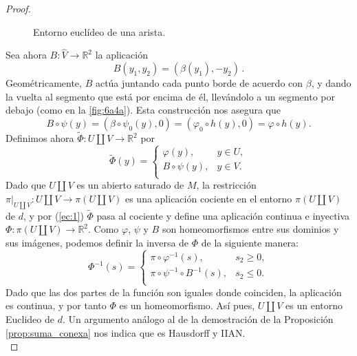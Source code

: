 \documentclass[10pt]{report}
\newcommand{\R}{\mathbb{R}}
\theoremstyle{definition}
\begin{document}
\begin{proof}
\begin{figure}
\caption{Entorno euclídeo de una arista. \label{fig:6a4a}}
\end{figure}

Sea ahora $B:\widehat{V}\to \R^2$ la aplicación $$B(y_1,y_2)=\left(\beta (y_1), -y_2\right)\, .$$
Geométricamente, $B$ actúa juntando cada punto borde de acuerdo con $\beta$, y dando la vuelta al segmento que está por encima de él, llevándolo a un segmento por debajo (como en la \autoref{fig:6a4a}). Esta construcción nos asegura que 
\begin{equation}\label{ec:1}
B\circ \psi(y)=\left(\beta \circ \psi_0(y),0\right)=\left(\varphi_0 \circ h(y),0\right)=\varphi \circ h(y).
\end{equation}
Definimos ahora $\tilde{\Phi}:U\amalg V\to \R^2$ por $$\tilde{\Phi}(y)=\begin{cases}
\varphi(y), & y\in U,\\
B\circ \psi (y), & y\in V.\\
\end{cases}$$
Dado que $U\amalg V$ es un abierto saturado de $M$, la restricción $\pi|_{U\amalg V}:U\amalg V\to \pi (U\amalg V)$ es una aplicación cociente en el entorno $\pi (U\amalg V)$ de $d$, y por (\ref{ec:1}) $\tilde{\Phi}$ pasa al cociente y define una aplicación continua e inyectiva $\Phi :\pi (U\amalg V)\to \R^2$. Como $\varphi$, $\psi$ y $B$ son homeomorfismos entre sus dominios y sus imágenes, podemos definir la inversa de $\Phi$ de la siguiente manera:
$$\Phi ^{-1}(s)= \begin{cases} 
\pi \circ \varphi ^{-1}(s), & s_2\geq 0, \\
\pi \circ \psi ^{-1} \circ B^{-1}(s), & s_2\leq 0.\\
 \end{cases}$$
Dado que las dos partes de la función son iguales donde coinciden, la aplicación es continua, y por tanto $\Phi$ es un homeomorfismo. Así pues, $U\amalg V$ es un entorno Euclideo de $d$. Un argumento análogo al de la demostración de la Proposición \ref{prop:suma_conexa} nos indica que es Hausdorff y IIAN.\\

\end{proof}
\end{document}
